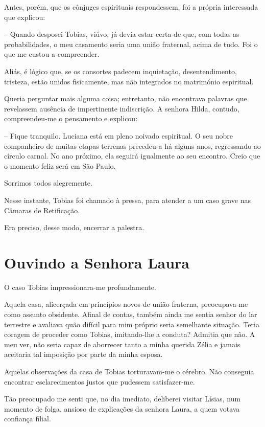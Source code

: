 \documentclass[portuguese,12pt,a4paper]{scrbook}
\begin{document}
	Antes, porém, que os cônjuges espirituais respondessem, foi a própria interessada que explicou:
	
	– Quando desposei Tobias, viúvo, já devia estar certa de que, com todas as probabilidades, o meu casamento seria uma união fraternal, acima de tudo. Foi o que me custou a compreender.
	
	Aliás, é lógico que, se os consortes padecem inquietação, desentendimento, tristeza, estão unidos fisicamente, mas não integrados no matrimónio espiritual.
	
	Queria perguntar mais alguma coisa; entretanto, não encontrava palavras que revelassem ausência de impertinente indiscrição. A senhora Hilda, contudo, compreendeu-me o pensamento e explicou:
	
	– Fique tranquilo. Luciana está em pleno noivado espiritual. O seu nobre companheiro de muitas etapas terrenas precedeu-a há alguns anos, regressando ao círculo carnal. No ano próximo, ela seguirá igualmente ao seu encontro. Creio que o momento feliz será em São Paulo.
	
	Sorrimos todos alegremente.
	
	Nesse instante, Tobias foi chamado à pressa, para atender a um caso grave nas Câmaras de Retificação.
	
	
	Era preciso, desse modo, encerrar a palestra.
	
	
	\chapter{Ouvindo a Senhora Laura}
	
	O caso Tobias impressionara-me profundamente.
	
	Aquela casa, alicerçada em princípios novos de união fraterna, preocupava-me como assunto obsidente. Afinal de contas, também ainda me sentia senhor do lar terrestre e avaliava quão difícil para mim próprio seria semelhante situação. Teria coragem de proceder como Tobias, imitando-lhe a conduta? Admitia que não. A meu ver, não seria capaz de aborrecer tanto a minha querida Zélia e jamais aceitaria tal imposição por parte da minha esposa.
	
	Aquelas observações da casa de Tobias torturavam-me o cérebro. Não conseguia encontrar esclarecimentos justos que pudessem satisfazer-me.
	
	Tão preocupado me senti que, no dia imediato, deliberei visitar Lísias, num momento de folga, ansioso de explicações da senhora Laura, a quem votava confiança filial.
	
\end{document}
